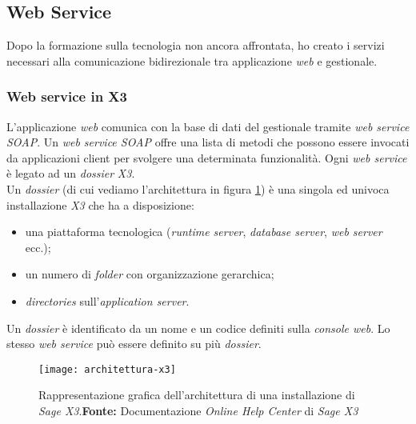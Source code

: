 \subsection{Web Service}
Dopo la formazione sulla tecnologia non ancora affrontata, ho creato i servizi
necessari alla comunicazione bidirezionale tra applicazione \textit{web} e gestionale.

\subsubsection{Web service in X3}
L'applicazione \textit{web} comunica con la base di dati del gestionale tramite \textit{web service SOAP}.
Un \textit{web service SOAP} offre una lista di metodi che possono essere invocati da applicazioni client per svolgere una determinata funzionalità.
Ogni \textit{web service} è legato ad un \textit{dossier} \textit{X3}.\\
Un \textit{dossier} (di cui vediamo l'architettura in figura \ref{fig:architettura-x3}) è una singola ed univoca installazione \textit{X3} che ha a disposizione:
\begin{itemize}
	\item una piattaforma tecnologica (\textit{runtime server}, \textit{database server}, \textit{web server} ecc.);
	\item un numero di \textit{folder} con organizzazione gerarchica;
	\item \textit{directories} sull'\textit{application server}.
\end{itemize}
Un \textit{dossier} è identificato da un nome e un codice definiti sulla \textit{console web}.
Lo stesso \textit{web service} può essere definito su più \textit{dossier}.

\begin{figure}[htbp]
	\begin{center}
		\texttt{[image: architettura-x3]}
		\caption{Rappresentazione grafica dell'architettura di una installazione di \textit{Sage X3}.\newline \textbf{Fonte:} Documentazione \textit{Online Help Center} di \textit{Sage X3}}
		\label{fig:architettura-x3}
	\end{center}
\end{figure}


